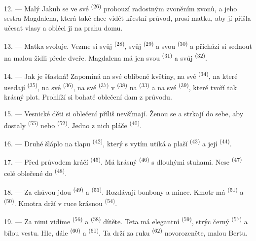 12. --- Malý Jakub se ve své  \textsuperscript{(26)} probouzí
radostným zvoněním zvonů, a jeho sestra Magdalena, která také chce vidět křestní
průvod, prosí matku, aby jí přišla učesat vlasy a obléci ji na prahu domu.

13. --- Matka svoluje. Vezme si svůj  \textsuperscript{(28)}, svůj
 \textsuperscript{(29)} a svou 
\textsuperscript{(30)} a přichází si sednout na malou židli přede dveře. Magdalena má
jen svou  \textsuperscript{(31)} a svůj 
\textsuperscript{(32)}.

14. --- Jak je šťastná! Zapomíná na své oblíbené květiny, na své 
\textsuperscript{(34)}, na které usedají  \textsuperscript{(35)}, na
své  \textsuperscript{(36)}, na své 
\textsuperscript{(37)} v  \textsuperscript{(38)} na 
\textsuperscript{(33)} a na své  \textsuperscript{(39)}, které tvoří tak
krásný plot. Prohlíží si bohaté oblečení dam z průvodu.

15. --- Vesnické děti si oblečení příliš nevšímají. Ženou se a strkají do sebe, aby
dostaly  \textsuperscript{(55)} nebo 
\textsuperscript{(52)}. Jedno z nich pláče \textsuperscript{(40)}.

16. --- Druhé šláplo na tlapu  \textsuperscript{(42)}, který s vytím
utíká a plaší  \textsuperscript{(43)} a její 
\textsuperscript{(44)}.

\VUsaut{5.0mm}
\VUsaut{4.0mm}

17. --- Před průvodem kráčí  \textsuperscript{(45)}. Má krásný
 \textsuperscript{(46)} s dlouhými stuhami. Nese 
\textsuperscript{(47)} celé oblečené do  \textsuperscript{(48)}.

18. --- Za chůvou jdou  \textsuperscript{(49)} a 
\textsuperscript{(53)}. Rozdávají bonbony a mince. Kmotr má 
\textsuperscript{(51)} a  \textsuperscript{(50)}. Kmotra drží v ruce
krásnou  \textsuperscript{(54)}.

19. --- Za nimi vidíme  \textsuperscript{(56)} a 
\textsuperscript{(58)} dítěte. Teta má elegantní 
\textsuperscript{(59)}, strýc černý  \textsuperscript{(57)} a bílou
vestu. Hle, dále  \textsuperscript{(60)} a 
\textsuperscript{(61)}. Ta drží za ruku  \textsuperscript{(62)}
novorozeněte, malou Bertu.


